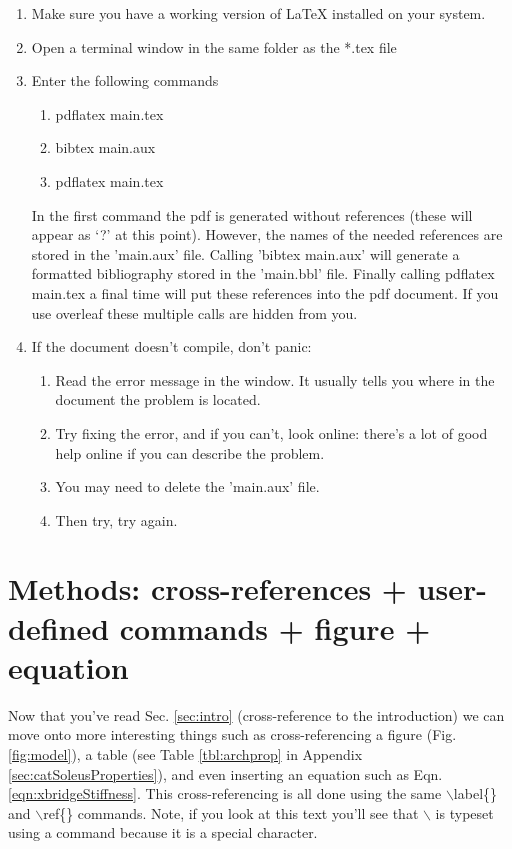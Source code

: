 \documentclass[11pt,twocolumn,a4paper]{article}
\begin{document}
\begin{enumerate}
\item Make sure you have a working version of \LaTeX{} installed on your system.    
\item Open a terminal window in the same folder as the *.tex file
\item Enter the following commands
\begin{enumerate}
    \item pdflatex main.tex
    \item bibtex main.aux
    \item pdflatex main.tex    
\end{enumerate}    
In the first command the pdf is generated without references (these will appear as `?' at this point). However, the names of the needed references are stored in the 'main.aux' file. Calling 'bibtex main.aux' will generate a formatted bibliography stored in the 'main.bbl' file. Finally calling pdflatex main.tex a final time will put these references into the pdf document. If you use overleaf these multiple calls are hidden from you.
\item If the document doesn't compile, don't panic:
\begin{enumerate}
    \item Read the error message in the window. It usually tells you where in the document the problem is located.
    \item Try fixing the error, and if you can't, look online: there's a lot of good help online if you can describe the problem.
    \item You may need to delete the 'main.aux' file. 
    \item Then try, try again.
\end{enumerate}
\end{enumerate}    




\section{Methods: cross-references + user-defined commands + figure + equation}

\label{sec:model}


Now that you've read Sec. \ref{sec:intro} (cross-reference to the introduction) we can move onto more interesting things such as cross-referencing a figure (Fig. \ref{fig:model}), a table (see Table \ref{tbl:archprop} in Appendix \ref{sec:catSoleusProperties}), and even inserting an equation such as Eqn. \ref{eqn:xbridgeStiffness}. 
This cross-referencing is all done using the same $\backslash$label\{\} and $\backslash$ref\{\} commands. Note, if you look at this text you'll see that $\backslash$ is typeset using a command because it is a special character.
\end{document}
